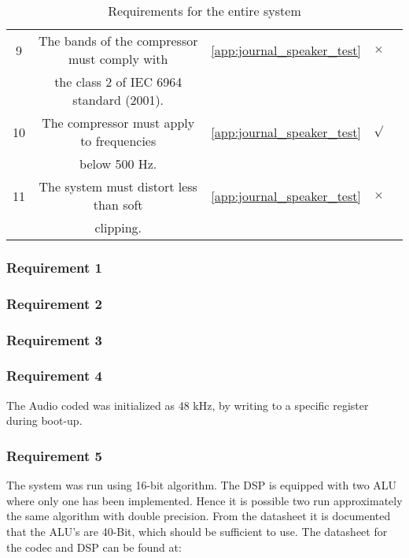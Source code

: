 \begin{table}[H]
\begin{tabular}{|c|c|c|c|c|}
9			& The bands of the compressor must comply with 	& \autoref{app:journal_speaker_test}	&	$\times$		\\ 
			& the class 2 of IEC 6964 standard (2001).		& 			 					 		&					\\ \hline
%
10			& The compressor must apply to frequencies		& \autoref{app:journal_speaker_test}	&	$\surd$			\\ 
			& below 500 Hz. 							 	&			 							&					\\ \hline
%
11			& The system must distort less than soft  		& \autoref{app:journal_speaker_test}	&	$\times$		\\ 
			& clipping.										& 			 						 	&					\\ \hline								
\end{tabular}	
\caption{Requirements for the entire system}
\label{table:acceptancetest}
\end{table}

\subsubsection*{Requirement 1}

\subsubsection*{Requirement 2}

\subsubsection*{Requirement 3}

\subsubsection*{Requirement 4}
The Audio coded was initialized as 48 kHz, by writing to a specific register during boot-up. 
\subsubsection*{Requirement 5}
The system was run using 16-bit algorithm. The DSP is equipped with two ALU where only one has been implemented. Hence it is possible two run approximately the same algorithm with double precision. From the datasheet it is documented that the ALU's are 40-Bit, which should be sufficient to use. The datasheet for the codec and DSP can be found at: \\
\\


